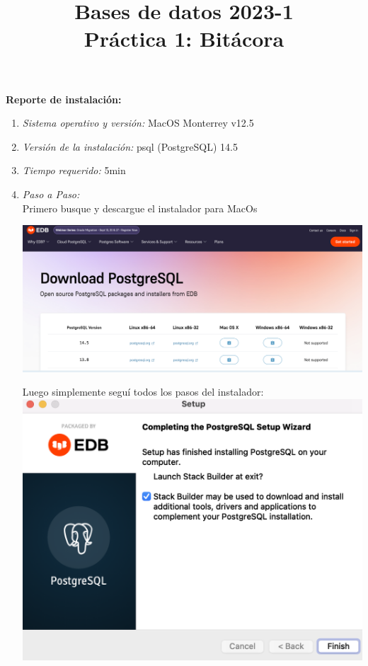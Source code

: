 \documentclass[12pt,a4paper]{article}
\title{Bases de datos 2023-1\\
Práctica 1: Bitácora}
\begin{document}
\maketitle

\textbf{Reporte de instalación:}\\
\begin{enumerate}
	\item \textit{Sistema operativo y versión:} MacOS Monterrey v12.5\\


	\item \textit{Versión de la instalación:} psql (PostgreSQL) 14.5\\

	\item \textit{Tiempo requerido:} 5min\\

	\item \textit{Paso a Paso:}\\
		Primero busque y descargue el instalador para MacOs 
		
		\includegraphics[scale=0.2]{assets/step01.png}

		Luego simplemente seguí todos los pasos del instalador:\\
		
		\includegraphics[scale=0.3]{assets/step02.png}


\end{enumerate}
\end{document}
